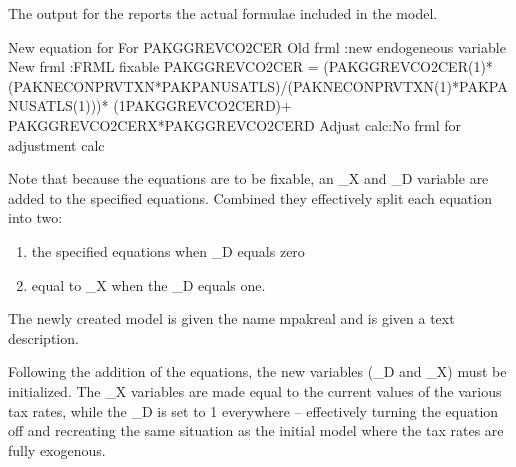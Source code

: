 \documentclass[letterpaper,10pt,english]{jupyterBook}
\begin{document}
\sphinxAtStartPar
The output for the  reports the actual formulae included in the model.

\begin{sphinxVerbatim}[commandchars=\\\{\}]
New equation for For PAKGGREVCO2CER
Old frml   :new endogeneous variable 
New frml   :FRML \PYGZlt{}fixable\PYGZgt{} PAKGGREVCO2CER = (PAKGGREVCO2CER(\PYGZhy{}1)*(PAKNECONPRVTXN*PAKPANUSATLS)/(PAKNECONPRVTXN(\PYGZhy{}1)*PAKPANUSATLS(\PYGZhy{}1)))* (1\PYGZhy{}PAKGGREVCO2CER\PYGZus{}D)+ PAKGGREVCO2CER\PYGZus{}X*PAKGGREVCO2CER\PYGZus{}D\PYGZdl{}
Adjust calc:No frml for adjustment calc 
\end{sphinxVerbatim}

\sphinxAtStartPar
Note that because the equations are to be fixable, an \_X and \_D variable are added to the specified equations. Combined they effectively split each equation into  two:
\begin{enumerate}
%
\item {} 
\sphinxAtStartPar
the specified equations when \_D equals zero

\item {} 
\sphinxAtStartPar
equal to \_X when the \_D equals one.

\end{enumerate}

\sphinxAtStartPar
The newly created model is given the name mpakreal and is given a text description.

\sphinxAtStartPar
Following the addition of the equations, the new variables (\_D and \_X) must be initialized. The \_X variables are made equal to the current values of the various tax rates, while the \_D is set to 1 everywhere – effectively turning the equation off and re\sphinxhyphen{}creating the same situation as the initial model where the tax rates are fully exogenous.
\end{document}
